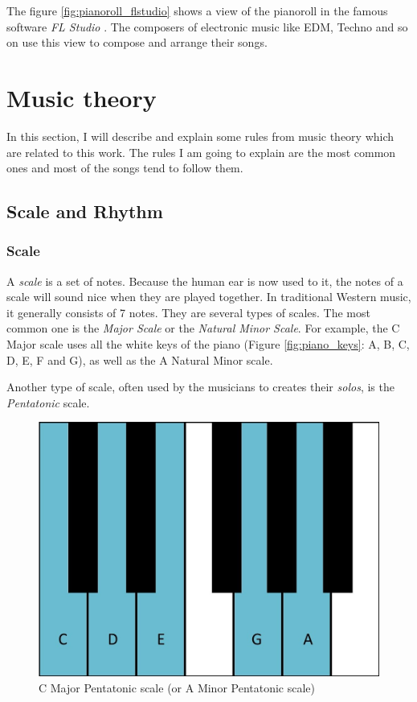 \documentclass[12pt]{report}
\begin{document}
The figure \ref{fig:pianoroll_flstudio} shows a view of the pianoroll in the famous software \textit{FL Studio} \cite{noauthor_fl_nodate}. The composers of electronic music like EDM, Techno and so on use this view to compose and arrange their songs.


\section{Music theory}
\label{sec:back:music-theory}

In this section, I will describe and explain some rules from music theory which are related to this work.
The rules I am going to explain are the most common ones and most of the songs tend to follow them.

\subsection{Scale and Rhythm}

\subsubsection{Scale}

A \textit{scale} is a set of notes.
Because the human ear is now used to it, the notes of a scale will sound nice when they are played together.
In traditional Western music, it generally consists of 7 notes.
They are several types of scales.
The most common one is the \textit{Major Scale} or the \textit{Natural Minor Scale}.
For example, the C Major scale uses all the white keys of the piano (Figure \ref{fig:piano_keys}: A, B, C, D, E, F and G), as well as the A Natural Minor scale.

Another type of scale, often used by the musicians to creates their \textit{solos}, is the \textit{Pentatonic} scale.


\begin{figure}[H]
    \centering
    \includegraphics[width=0.5 \textwidth]{images/music/piano/pentatonic_scale.jpg}
    \caption{C Major Pentatonic scale (or A Minor Pentatonic scale)}
    \label{fig:pentatonic_scale_piano}
\end{figure}
\end{document}
